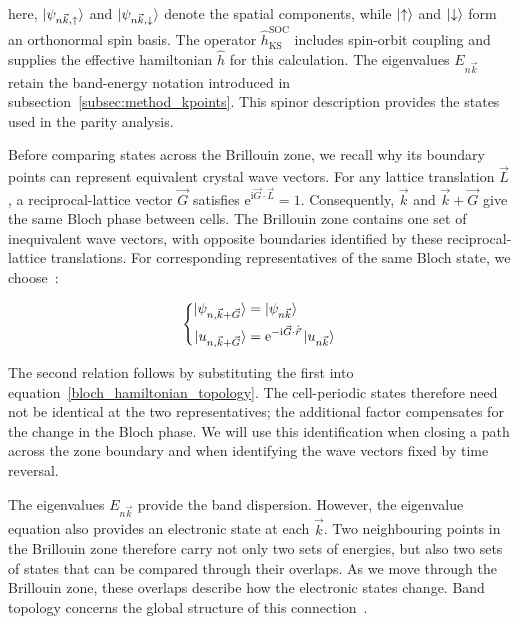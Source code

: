 here, $\ket{\psi_{n\vec{k},\uparrow}}$ and $\ket{\psi_{n\vec{k},\downarrow}}$ denote the spatial components,
while $\ket{\uparrow}$ and $\ket{\downarrow}$ form an orthonormal spin basis.
The operator $\hat{h}_\mathrm{KS}^\mathrm{SOC}$ includes spin-orbit coupling and supplies the effective hamiltonian $\hat{h}$ for this calculation.
The eigenvalues $E_{n\vec{k}}$ retain the band-energy notation introduced in subsection~\ref{subsec:method_kpoints}.
This spinor description provides the states used in the parity analysis.

Before comparing states across the Brillouin zone, we recall why its boundary points can represent equivalent crystal wave vectors.
For any lattice translation $\vec{L}$, a reciprocal-lattice vector $\vec{G}$ satisfies
$\mathrm{e}^{\mathrm{i}\vec{G}\cdot\vec{L}}=1$.
Consequently, $\vec{k}$ and $\vec{k}+\vec{G}$ give the same Bloch phase between cells.
The Brillouin zone contains one set of inequivalent wave vectors, with opposite boundaries identified by these reciprocal-lattice translations.
For corresponding representatives of the same Bloch state, we choose~\cite{fu2007topological}:

\begin{equation}
\left\{\begin{aligned}
    \ket{\psi_{n,\vec{k}+\vec{G}}}&=\ket{\psi_{n\vec{k}}} \\
    \ket{u_{n,\vec{k}+\vec{G}}}
    &=\mathrm{e}^{-\mathrm{i}\vec{G}\cdot\hat{\vec{r}}}\ket{u_{n\vec{k}}}
\end{aligned}\right.
\label{reciprocal_lattice_identification_topology}
\end{equation}

The second relation follows by substituting the first into equation~\eqref{bloch_hamiltonian_topology}.
The cell-periodic states therefore need not be identical at the two representatives;
the additional factor compensates for the change in the Bloch phase.
We will use this identification when closing a path across the zone boundary and when identifying the wave vectors fixed by time reversal.

The eigenvalues $E_{n\vec{k}}$ provide the band dispersion.
However, the eigenvalue equation also provides an electronic state at each $\vec{k}$.
Two neighbouring points in the Brillouin zone therefore carry not only two sets of energies,
but also two sets of states that can be compared through their overlaps.
As we move through the Brillouin zone, these overlaps describe how the electronic states change.
Band topology concerns the global structure of this connection~\cite{vanderbilt2018berry}.

